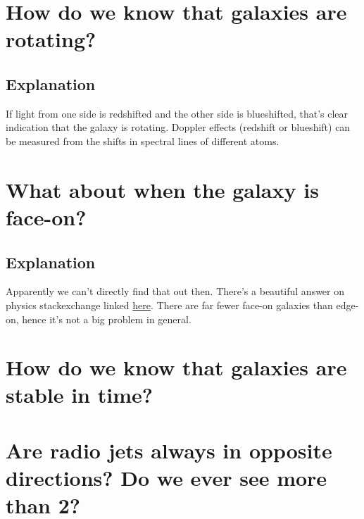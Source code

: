 \documentclass[a4paper,12pt]{article}
\begin{document}
\section{How do we know that galaxies are rotating?}

\subsection*{Explanation}
If light from one side is redshifted and the other side is blueshifted, that's clear indication that the galaxy is rotating. Doppler effects (redshift or blueshift) can be measured from the shifts in spectral lines of different atoms.


\section{What about when the galaxy is face-on?}

\subsection*{Explanation}
Apparently we can't directly find that out then. There's a beautiful answer on physics stackexchange linked \href{https://physics.stackexchange.com/questions/61652/rotational-velocity-of-face-on-spiral-galaxies-using-spectroscopy}{here}. There are far fewer face-on galaxies than edge-on, hence it's not a big problem in general.


\section{How do we know that galaxies are stable in time?}


\section{Are radio jets always in opposite directions? Do we ever see more than 2?}

\end{document}

